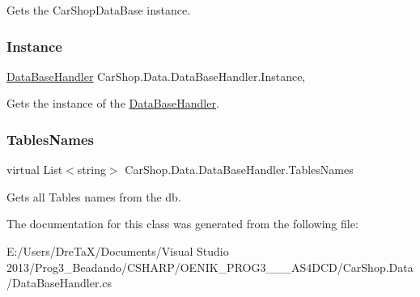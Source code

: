 Gets the Car\+Shop\+Data\+Base instance. 

\mbox{\label{class_car_shop_1_1_data_1_1_data_base_handler_a25f9fd5f7b7ea4f7a87eecfccf894d4a}} 
\subsubsection{\texorpdfstring{Instance}{Instance}}
{\footnotesize\ttfamily \mbox{\hyperlink{class_car_shop_1_1_data_1_1_data_base_handler}{Data\+Base\+Handler}} Car\+Shop.\+Data.\+Data\+Base\+Handler.\+Instance\hspace{0.3cm}{\ttfamily [static]}, {\ttfamily [get]}}



Gets the instance of the \mbox{\hyperlink{class_car_shop_1_1_data_1_1_data_base_handler}{Data\+Base\+Handler}}. 

\mbox{\label{class_car_shop_1_1_data_1_1_data_base_handler_a4af389005c2397df7a5fa9bfa8a7efef}} 
\subsubsection{\texorpdfstring{Tables\+Names}{TablesNames}}
{\footnotesize\ttfamily virtual List$<$string$>$ Car\+Shop.\+Data.\+Data\+Base\+Handler.\+Tables\+Names\hspace{0.3cm}{\ttfamily [get]}}



Gets all Table\textquotesingle{}s names from the db. 



The documentation for this class was generated from the following file\+:\begin{DoxyCompactItemize}
\item 
E\+:/\+Users/\+Dre\+Ta\+X/\+Documents/\+Visual Studio 2013/\+Prog3\+\_\+\+Beadando/\+C\+S\+H\+A\+R\+P/\+O\+E\+N\+I\+K\+\_\+\+P\+R\+O\+G3\+\_\+\_\+\_\+\+A\+S4\+D\+C\+D/\+Car\+Shop.\+Data/Data\+Base\+Handler.\+cs\end{DoxyCompactItemize}
